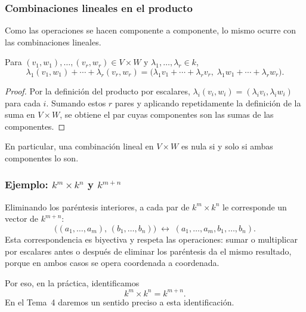 \begin{frame}
    \frametitle{Combinaciones lineales en el producto}

    Como las operaciones se hacen componente a componente, lo mismo
    ocurre con las combinaciones lineales.

    \begin{proposition}
        Para $(v_1,w_1),\ldots,(v_r,w_r)\in V\times W$ y
        $\lambda_1,\ldots,\lambda_r\in k$,
        \[
            \lambda_1(v_1,w_1)+\cdots+\lambda_r(v_r,w_r)
            =
            \bigl(\lambda_1v_1+\cdots+\lambda_rv_r,\;
                  \lambda_1w_1+\cdots+\lambda_rw_r\bigr).
        \]
    \end{proposition}

    \begin{proof}
        Por la definición del producto por escalares,
        $\lambda_i(v_i,w_i)=(\lambda_iv_i,\lambda_iw_i)$ para cada $i$.
        Sumando estos $r$ pares y aplicando repetidamente la definición
        de la suma en $V\times W$, se obtiene el par cuyas componentes son
        las sumas de las componentes.
    \end{proof}

    \medskip

    En particular, una combinación lineal en $V\times W$ es nula
    si y solo si \alert{ambas} componentes lo son.
\end{frame}


\begin{frame}
    \frametitle{Ejemplo: $k^m\times k^n$ y $k^{m+n}$}

    \begin{example}
        Eliminando los paréntesis interiores, a cada par de
        $k^m\times k^n$ le corresponde un vector de $k^{m+n}$:
        \[
            \bigl((a_1,\ldots,a_m),\,(b_1,\ldots,b_n)\bigr)
            \;\longleftrightarrow\;
            (a_1,\ldots,a_m,b_1,\ldots,b_n).
        \]
        Esta correspondencia es biyectiva y respeta las operaciones:
        sumar o multiplicar por escalares antes o después de eliminar
        los paréntesis da el mismo resultado, porque en ambos casos
        se opera coordenada a coordenada.
    \end{example}

    \medskip

    Por eso, en la práctica, identificamos
    \[
        k^m\times k^n=k^{m+n}.
    \]
    En el Tema~4 daremos un sentido preciso a esta identificación.
\end{frame}


